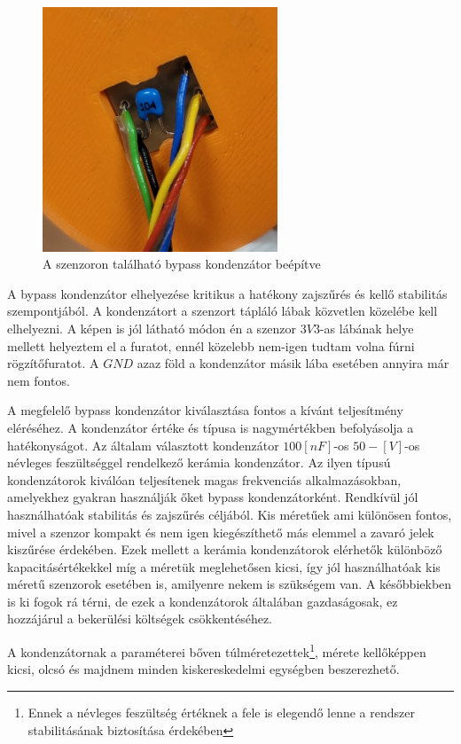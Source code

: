 \begin{figure}[!ht]
\centering
\includegraphics[width=70mm, keepaspectratio]{figures/Csuklo_szog_teszt/bypass}
\caption{A szenzoron található bypass kondenzátor beépítve}
\label{fig:bypass}
\end{figure}

A bypass kondenzátor elhelyezése kritikus a hatékony zajszűrés és kellő stabilitás szempontjából. A kondenzátort a szenzort tápláló lábak közvetlen közelébe kell elhelyezni. A képen is jól látható módon én a szenzor $3V3$-as lábának helye mellett helyeztem el a furatot, ennél közelebb nem-igen tudtam volna fúrni rögzítőfuratot. A $GND$ azaz föld a kondenzátor másik lába esetében annyira már nem fontos.\cite{bypasskond}\cite{vezetekellen}

A megfelelő bypass kondenzátor kiválasztása fontos a kívánt teljesítmény eléréséhez. A kondenzátor értéke és típusa is nagymértékben befolyásolja a hatékonyságot. Az általam választott kondenzátor $100[nF]$-os $50-[V]$-os névleges feszültséggel rendelkező kerámia kondenzátor. Az ilyen típusú kondenzátorok kiválóan teljesítenek magas frekvenciás alkalmazásokban, amelyekhez gyakran használják őket bypass kondenzátorként. Rendkívül jól használhatóak stabilitás és zajszűrés céljából. Kis méretűek ami különösen fontos, mivel a szenzor kompakt és nem igen kiegészíthető más elemmel a zavaró jelek kiszűrése érdekében. Ezek mellett a kerámia kondenzátorok elérhetők különböző kapacitásértékekkel míg a méretük meglehetősen kicsi, így jól használhatóak kis méretű szenzorok esetében is, amilyenre nekem is szükségem van. A későbbiekben is ki fogok rá térni, de ezek a kondenzátorok általában gazdaságosak, ez hozzájárul a bekerülési költségek csökkentéséhez.

A kondenzátornak a paraméterei bőven túlméretezettek\footnote{Ennek a névleges feszültség értéknek a fele is elegendő lenne a rendszer stabilitásának biztosítása érdekében}, mérete kellőképpen kicsi, olcsó és majdnem minden kiskereskedelmi egységben beszerezhető.

